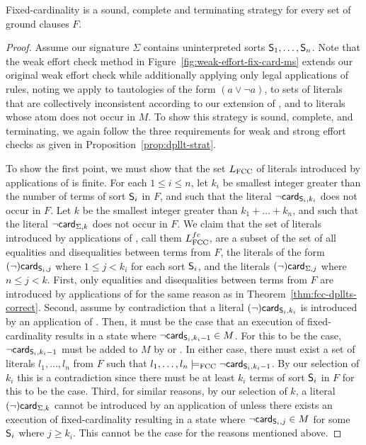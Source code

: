 \documentclass{svjour3}                     %
\begin{document}
\begin{thm}
\label{thm:fixed-card-dpllts}
Fixed-cardinality \checkfcc is a sound, complete and terminating strategy 
for every set of ground clauses $F$.
\end{thm}
\begin{proof}
Assume our signature $\Sigma$ contains uninterpreted sorts $\So_1, \ldots, \So_n$.
Note that the weak effort check method in Figure~\ref{fig:weak-effort-fix-card-ms} 
extends our original weak effort check while additionally applying only legal
applications of \dpllts rules, noting we apply  to tautologies of the form $(a \vee \neg a)$,
 to sets of literals that are collectively inconsistent according to our extension of \fcc, and
\decide to literals whose atom does not occur in $M$.
To show this strategy is sound, complete, and terminating, 
we again follow the three requirements for weak and strong effort checks as given in Proposition~\ref{prop:dpllt-strat}.

To show the first point,
we must show that the set $L_\fcc$ of literals introduced by applications of  is finite.
For each $1 \leq i \leq n$, let $k_i$ be smallest integer greater than the number of terms of sort $\So_i$ in $F$,
and such that the literal $\neg \card[\So_i,k_i]$ does not occur in $F$.
Let $k$ be the smallest integer greater than $k_1 + \ldots + k_n$,
and such that the literal $\neg \card[\Sigma,k]$ does not occur in $F$.
We claim that the set of literals introduced by applications of , call them $L^{fc}_\fcc$,
are a subset of the set of all equalities and disequalities between terms from $F$,
the literals of the form $(\neg) \card[\So_i,j]$ where $1 \leq j \lt k_i$ for each sort $\So_i$,
and the literals $(\neg) \card[\Sigma,j]$ where $n \leq j \lt k$.
First,
only equalities and disequalities between terms from $F$ are introduced by applications of 
for the same reason as in Theorem~\ref{thm:fcc-dpllts-correct}.
Second, assume by contradiction that a literal $(\neg) \card[\So_i,k_i]$ is introduced by an application of .
Then, it must be the case that an execution of fixed-cardinality \checkfcc results in a state where
$\neg \card[\So_i,k_i-1] \in M$.
For this to be the case, 
$\neg \card[\So_i,k_i-1]$ must be added to $M$ by  or \backjump.
In either case, there must exist a set of literals $l_1, \ldots, l_n$ from $F$
such that $l_1, \ldots, l_n \models_\fcc \neg \card[\So_i,k_i-1]$.
By our selection of $k_i$ this is a contradiction
since there must be at least $k_i$ terms of sort $\So_i$ in $F$ for this to be the case.
Third, for similar reasons, by our selection of $k$, 
a literal $(\neg) \card[\Sigma,k]$ cannot be introduced by an application of  
unless there exists an execution of fixed-cardinality \checkfcc resulting in a state where
$\neg \card[\So_i,j] \in M$ for some $\So_i$ where $j \geq k_i$.
This cannot be the case for the reasons mentioned above.


\end{proof}
\end{document}

